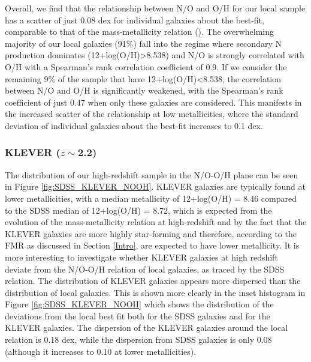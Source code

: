 \documentclass[usenatbib]{mnras} %
\begin{document}
Overall, we find that the relationship between N/O and O/H for our local sample has a scatter of just 0.08 dex for individual galaxies about the best-fit, comparable to that of the mass-metallicity relation (\citealt{Curti_2020FMR}). The overwhelming majority of our local galaxies (91\%) fall into the regime where secondary N production dominates (12+log(O/H)>8.538) and N/O is strongly correlated with O/H with a Spearman's rank correlation coefficient of 0.9. If we consider the remaining 9\% of the sample that have 12+log(O/H)<8.538, the correlation between N/O and O/H is significantly weakened, with the Spearman's rank coefficient of just 0.47 when only these galaxies are considered. This manifests in the increased scatter of the relationship at low metallicities, where the standard deviation of individual galaxies about the best-fit increases to 0.1 dex. 

\subsubsection{KLEVER ($z\sim$2.2)}

The distribution of our high-redshift sample in the N/O-O/H plane can be seen in Figure \ref{fig:SDSS_KLEVER_NOOH}. KLEVER galaxies are typically found at lower metallicities, with a median metallicity of 12+log(O/H) = 8.46 compared to the SDSS median of 12+log(O/H) = 8.72, which is expected from the evolution of the mass-metallicity relation at high-redshift and by the fact that the KLEVER galaxies are more highly star-forming and therefore, according to the FMR as discussed in Section \ref{Intro}, are expected to have lower metallicity. It is more interesting to investigate whether KLEVER galaxies at high redshift deviate from the N/O-O/H relation of local galaxies, as traced by the SDSS relation. The distribution of KLEVER galaxies appears more dispersed than the distribution of local galaxies. This is shown more clearly in the inset histogram in Figure \ref{fig:SDSS_KLEVER_NOOH} which shows the distribution of the deviations from the local best fit both for the SDSS galaxies and for the KLEVER galaxies. The dispersion of the KLEVER galaxies around the local relation is 0.18 dex, while the dispersion from SDSS galaxies is only 0.08 (although it increases to 0.10 at lower metallicities). 

\end{document}

